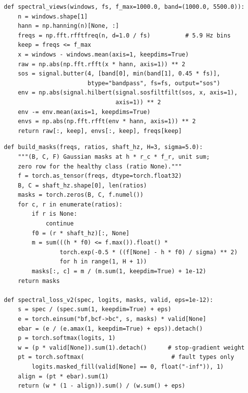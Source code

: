 \documentclass[conference]{IEEEtran}
\begin{document}
\begin{lstlisting}[float=*tp, caption={High-resolution raw and squared-envelope spectra.},label={lst:spec}]
def spectral_views(windows, fs, f_max=1000.0, band=(1000.0, 5500.0)):
    n = windows.shape[1]
    hann = np.hanning(n)[None, :]
    freqs = np.fft.rfftfreq(n, d=1.0 / fs)          # 5.9 Hz bins
    keep = freqs <= f_max
    x = windows - windows.mean(axis=1, keepdims=True)
    raw = np.abs(np.fft.rfft(x * hann, axis=1)) ** 2
    sos = signal.butter(4, [band[0], min(band[1], 0.45 * fs)],
                        btype="bandpass", fs=fs, output="sos")
    env = np.abs(signal.hilbert(signal.sosfiltfilt(sos, x, axis=1),
                                axis=1)) ** 2
    env -= env.mean(axis=1, keepdims=True)
    envs = np.abs(np.fft.rfft(env * hann, axis=1)) ** 2
    return raw[:, keep], envs[:, keep], freqs[keep]
\end{lstlisting}

\begin{lstlisting}[float=*tp, caption={Per-window masks and the revised spectral term $L_{\mathrm{spec}}^{\mathrm{v2}}$ (Eq.~\eqref{eq:v2}).},label={lst:loss}]
def build_masks(freqs, ratios, shaft_hz, H=3, sigma=5.0):
    """(B, C, F) Gaussian masks at h * r_c * f_r, unit sum;
    zero row for the healthy class (ratio None)."""
    f = torch.as_tensor(freqs, dtype=torch.float32)
    B, C = shaft_hz.shape[0], len(ratios)
    masks = torch.zeros(B, C, f.numel())
    for c, r in enumerate(ratios):
        if r is None:
            continue
        f0 = (r * shaft_hz)[:, None]
        m = sum(((h * f0) <= f.max()).float() *
                torch.exp(-0.5 * ((f[None] - h * f0) / sigma) ** 2)
                for h in range(1, H + 1))
        masks[:, c] = m / (m.sum(1, keepdim=True) + 1e-12)
    return masks

def spectral_loss_v2(spec, logits, masks, valid, eps=1e-12):
    s = spec / (spec.sum(1, keepdim=True) + eps)
    e = torch.einsum("bf,bcf->bc", s, masks) * valid[None]
    ebar = (e / (e.amax(1, keepdim=True) + eps)).detach()
    p = torch.softmax(logits, 1)
    w = (p * valid[None]).sum(1).detach()      # stop-gradient weight
    pt = torch.softmax(                         # fault types only
        logits.masked_fill(valid[None] == 0, float("-inf")), 1)
    align = (pt * ebar).sum(1)
    return (w * (1 - align)).sum() / (w.sum() + eps)
\end{lstlisting}
\end{document}
